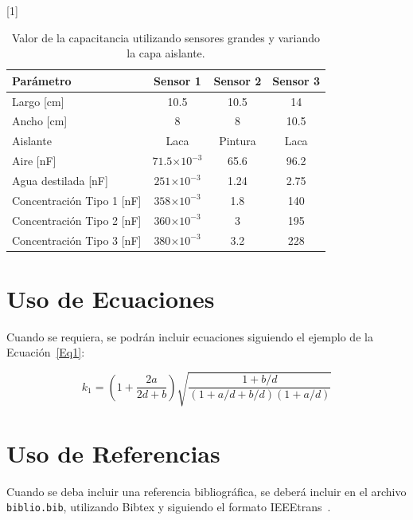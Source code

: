 \begin{table}[ht]
\begin{center}
\caption{Valor de la capacitancia utilizando sensores grandes y variando la capa aislante.}
\scalebox{1}[1]{
\begin{tabular}{| l | c | c | c|}
\hline
 \textbf{Parámetro} & \textbf{Sensor 1} & \textbf{Sensor 2} & \textbf{Sensor 3} \\
\hline
\hline
 Largo [cm] & 10.5 & 10.5 & 14 \\
Ancho [cm] & 8 & 8 & 10.5 \\
Aislante & Laca & Pintura & Laca \\
Aire [nF] & $71.5\ensuremath{\times 10^{-3}}$ & 65.6 & 96.2 \\
Agua destilada [nF] & $251\ensuremath{\times 10^{-3}}$ & 1.24 & 2.75 \\
Concentración Tipo 1 [nF] & $358\ensuremath{\times 10^{-3}}$ & 1.8 & 140 \\
Concentración Tipo 2 [nF] & $360\ensuremath{\times 10^{-3}}$ & 3 & 195 \\
Concentración Tipo 3 [nF] & $380\ensuremath{\times 10^{-3}}$ &	3.2 & 228 \\
\hline
\end{tabular}}
\label{tabla:capacitancia}
\end{center}
\end{table}


\section{Uso de Ecuaciones}

Cuando se requiera, se podrán incluir ecuaciones siguiendo el ejemplo de la Ecuación~\ref{Eq1}:

\begin{equation} \label{Eq1}
k_1=\left(1+\frac{2a}{2d+b}\right) \sqrt{\frac{1+b/d}{(1+a/d+b/d)(1+a/d)}}
\end{equation}


\section{Uso de Referencias}

Cuando se deba incluir una referencia bibliográfica, se deberá incluir en el archivo \texttt{biblio.bib}, utilizando Bibtex y siguiendo el formato IEEEtrans~\cite{referencia1}.
